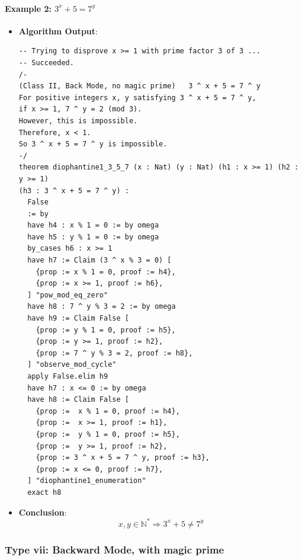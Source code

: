 \documentclass{article}
\begin{document}
\paragraph{Example 2: $3^x+5=7^y$}
\begin{itemize}
\item \textbf{Algorithm Output}:
    \begin{verbatim}
-- Trying to disprove x >= 1 with prime factor 3 of 3 ...
-- Succeeded.
/-
(Class II, Back Mode, no magic prime)   3 ^ x + 5 = 7 ^ y
For positive integers x, y satisfying 3 ^ x + 5 = 7 ^ y,
if x >= 1, 7 ^ y = 2 (mod 3).
However, this is impossible.
Therefore, x < 1.
So 3 ^ x + 5 = 7 ^ y is impossible.
-/
theorem diophantine1_3_5_7 (x : Nat) (y : Nat) (h1 : x >= 1) (h2 : y >= 1) 
(h3 : 3 ^ x + 5 = 7 ^ y) :      
  False
  := by
  have h4 : x % 1 = 0 := by omega
  have h5 : y % 1 = 0 := by omega
  by_cases h6 : x >= 1
  have h7 := Claim (3 ^ x % 3 = 0) [
    {prop := x % 1 = 0, proof := h4},
    {prop := x >= 1, proof := h6},
  ] "pow_mod_eq_zero"
  have h8 : 7 ^ y % 3 = 2 := by omega
  have h9 := Claim False [
    {prop := y % 1 = 0, proof := h5},
    {prop := y >= 1, proof := h2},
    {prop := 7 ^ y % 3 = 2, proof := h8},
  ] "observe_mod_cycle"
  apply False.elim h9
  have h7 : x <= 0 := by omega
  have h8 := Claim False [
    {prop :=  x % 1 = 0, proof := h4},
    {prop :=  x >= 1, proof := h1},
    {prop :=  y % 1 = 0, proof := h5},
    {prop :=  y >= 1, proof := h2},
    {prop := 3 ^ x + 5 = 7 ^ y, proof := h3},
    {prop := x <= 0, proof := h7},
  ] "diophantine1_enumeration"
  exact h8
    \end{verbatim}
    \item \textbf{Conclusion}:
    \[ x, y \in \mathbb{N}^* \Rightarrow 3^x+5 \neq 7^y \]
\end{itemize}

\subsubsection{Type vii: Backward Mode, with magic prime}
\end{document}
